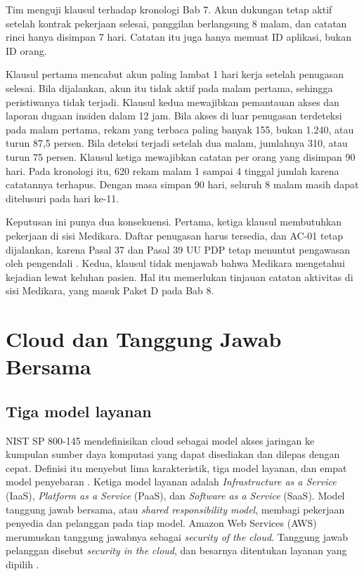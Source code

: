 \begin{kasus}[title={Kasus Medikara Health: Tiga Klausul yang Menjawab Insiden 2025}]
Tim menguji klausul terhadap kronologi Bab 7. Akun dukungan tetap aktif setelah kontrak pekerjaan
selesai, panggilan berlangsung 8 malam, dan catatan rinci hanya disimpan 7 hari. Catatan itu juga
hanya memuat ID aplikasi, bukan ID orang.

Klausul pertama mencabut akun paling lambat 1 hari kerja setelah penugasan selesai. Bila
dijalankan, akun itu tidak aktif pada malam pertama, sehingga peristiwanya tidak terjadi. Klausul
kedua mewajibkan pemantauan akses dan laporan dugaan insiden dalam 12 jam. Bila akses di luar
penugasan terdeteksi pada malam pertama, rekam yang terbaca paling banyak 155, bukan 1.240, atau
turun 87,5 persen. Bila deteksi terjadi setelah dua malam, jumlahnya 310, atau turun 75 persen.
Klausul ketiga mewajibkan catatan per orang yang disimpan 90 hari. Pada kronologi itu, 620 rekam
malam 1 sampai 4 tinggal jumlah karena catatannya terhapus. Dengan masa simpan 90 hari, seluruh 8
malam masih dapat ditelusuri pada hari ke-11.

Keputusan ini punya dua konsekuensi. Pertama, ketiga klausul membutuhkan pekerjaan di sisi
Medikara. Daftar penugasan harus tersedia, dan AC-01 tetap dijalankan, karena Pasal 37 dan Pasal 39
UU PDP tetap menuntut pengawasan oleh pengendali \cite{uu27-2022-pdp}. Kedua, klausul tidak menjawab
bahwa Medikara mengetahui kejadian lewat keluhan pasien. Hal itu memerlukan tinjauan catatan
aktivitas di sisi Medikara, yang masuk Paket D pada Bab 8.
\end{kasus}

\section{Cloud dan Tanggung Jawab Bersama}

\subsection*{Tiga model layanan}

NIST SP 800-145 mendefinisikan cloud sebagai model akses jaringan ke kumpulan sumber daya komputasi
yang dapat disediakan dan dilepas dengan cepat. Definisi itu menyebut lima karakteristik, tiga model
layanan, dan empat model penyebaran \cite{c09-nist-sp800145}. Ketiga model layanan adalah
\textit{Infrastructure as a Service} (IaaS), \textit{Platform as a Service} (PaaS), dan
\textit{Software as a Service} (SaaS). Model tanggung jawab bersama, atau \textit{shared
responsibility model}, membagi pekerjaan penyedia dan pelanggan pada tiap model. Amazon Web Services
(AWS) merumuskan tanggung jawabnya sebagai \textit{security of the cloud}. Tanggung jawab pelanggan
disebut \textit{security in the cloud}, dan besarnya ditentukan layanan yang dipilih
\cite{c09-aws-shared}.

